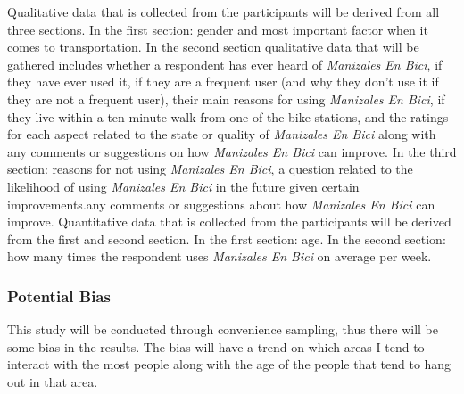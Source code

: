 \documentclass[12pt]{article}
\begin{document}
Qualitative data that is collected from the participants will be derived from all three sections. In the first section: gender and most important factor when it comes to transportation. In the second section qualitative data that will be gathered includes whether a respondent has ever heard of \textit{Manizales En Bici}, if they have ever used it, if they are a frequent user (and why they don't use it if they are not a frequent user), their main reasons for using \textit{Manizales En Bici}, if they live within a ten minute walk from one of the bike stations, and the ratings for each aspect related to the state or quality of \textit{Manizales En Bici} along with any comments or suggestions on how \textit{Manizales En Bici} can improve. In the third section: reasons for not using \textit{Manizales En Bici}, a question related to the likelihood of using \textit{Manizales En Bici} in the future given certain improvements.any comments or suggestions about how \textit{Manizales En Bici} can improve. Quantitative data that is collected from the participants will be derived from the first and second section. In the first section: age. In the second section: how many times the respondent uses \textit{Manizales En Bici} on average per week.
\subsubsection*{Potential Bias}
This study will be conducted through convenience sampling, thus there will be some bias in the results. The bias will have a trend on which areas I tend to interact with the most people along with the age of the people that tend to hang out in that area. 
\newpage
\printbibliography
\end{document}
